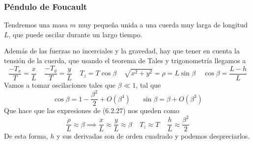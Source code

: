 \subsubsection{Péndulo de Foucault}

\begin{marginfigure}[0pt]
    \def\svgwidth{3.5 cm}
    \normalsize
	
    \vspace{-10pt}
\end{marginfigure}

Tendremos una masa $m$ muy pequeña unida a una cuerda muy larga de longitud $L$, que puede oscilar durante un largo tiempo.

Además de las fuerzas no incerciales y la gravedad, hay que tener en cuenta la tensión de la cuerda, que usando el teorema de Tales y trigonometría llegamos a
\begin{equation} \label{6.1.1}
    \frac{-T_x}{T} = \frac{x}{L} \ \ \ \ \ \frac{-T_y}{T} = \frac{y}{L} \ \ \ \ \ T_z = T \cos \beta \ \ \ \ \ \sqrt{x^2 +y^2} =\rho = L \sin \beta \ \ \ \ \  \cos\beta = \frac{L-h}{L}
\end{equation} 
Vamos a tomar oscilaciones tales que $\beta \ll 1$, tal que
\begin{equation} \label{6.1.1}
    \cos\beta = 1 -\frac{\beta^2}{2} + O(\beta^4) \ \ \ \ \ \ \ \sin \beta = \beta + O(\beta^3)
\end{equation} 
Que hace que las expresiones de (6.2.27) nos queden como
\begin{equation} \label{6.1.1}
    \frac{\rho}{L} \approx \beta \implies \frac{x}{L} \approx \frac{y}{L} \approx \beta \ \ \ \ \ T_z \approx T \ \ \ \ \  \frac{h}{L} \approx \frac{\beta^2}{2}
\end{equation} 
De esta forma, $h$ y sus derivadas son de orden cuadrado y podemos despreciarlos.
\begin{marginfigure}[0pt]
    \def\svgwidth{3.5 cm}
    \normalsize
	
    \vspace{-10pt}
\end{marginfigure}


